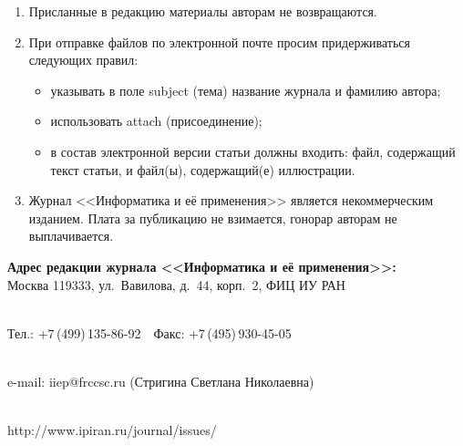 {\begin{enumerate}[1.]
\item Присланные в редакцию материалы авторам не возвращаются.\\[-13.5pt]

\item При отправке файлов по электронной почте просим придерживаться следующих
правил:
\begin{itemize}
\item указывать в поле subject (тема) название журнала и фамилию автора;\\[-13.5pt]
\item использовать attach (присоединение);\\[-13.5pt]
\item в состав электронной версии статьи должны входить: файл, содержащий текст
статьи, и файл(ы), содержащий(е) иллюстрации.\\[-13.5pt]
\end{itemize}

\item Журнал <<Информатика и её применения>> является некоммерческим изданием.
Плата за публикацию не взимается, гонорар авторам не выплачивается.
\end{enumerate}



\def\leftfootline{\small{\textbf{\thepage}
\hfill ИНФОРМАТИКА И ЕЁ ПРИМЕНЕНИЯ\ \ \ том\ 15\ \ \ выпуск\ 4\ \ \ 2021}
}%
 \def\rightfootline{\small{ИНФОРМАТИКА И ЕЁ ПРИМЕНЕНИЯ\ \ \ том\ 15\ \ \ выпуск\ 4\ \ \ 2021
\hfill \textbf{\thepage}}}



\begin{center}

\textbf{Адрес редакции журнала <<Информатика и её применения>>:} \\




Москва 119333, ул.~Вавилова, д.~44, корп.~2, ФИЦ ИУ РАН\\[-10pt]

\

Тел.: +7\,(499)\,135-86-92\ \ Факс:  +7\,(495)\,930-45-05\\[-10pt]

 \

e-mail:   {\sf iiep@frccsc.ru} (Стригина Светлана Николаевна)\\[-10pt]

\

{\sf http://www.ipiran.ru/journal/issues/}
\end{center}
}


\def\leftkol{Правила подготовки рукописей  для публикации в журнале
<<Информатика и её применения>>}

\def\rightkol{Правила подготовки рукописей  для публикации в журнале
<<Информатика и её применения>>}


\def\leftfootline{\small{\textbf{\thepage}
\hfill ИНФОРМАТИКА И ЕЁ ПРИМЕНЕНИЯ\ \ \ том\ 15\ \ \ выпуск\ 4\ \ \ 2021}
}%
 \def\rightfootline{\small{ИНФОРМАТИКА И ЕЁ ПРИМЕНЕНИЯ\ \ \ том\ 15\ \ \ выпуск\ 4\ \ \ 2021
\hfill \textbf{\thepage}}} 